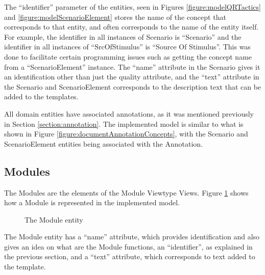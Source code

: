 The ``identifier'' parameter of the entities, seen in Figures \ref{figure:modelQRTactics} and \ref{figure:modelScenarioElement} stores the name of the concept that corresponds to that entity, and often corresponds to the name of the entity itself. For example, the identifier in all instances of Scenario is ``Scenario'' and the identifier in all instances of ``SrcOfStimulus'' is ``Source Of Stimulus''. This was done to facilitate certain programming issues such as getting the concept name from a ``ScenarioElement'' instance. The ``name'' attribute in the Scenario gives it an identification other than just the quality attribute, and the ``text'' attribute in the Scenario and ScenarioElement corresponds to the description text that can be added to the templates.

All domain entities have associated annotations, as it was mentioned previously in Section \ref{section:annotation}. The implemented model is similar to what is shown in Figure \ref{figure:documentAnnotationConcepts}, with the Scenario and ScenarioElement entities being associated with the Annotation.


\subsection{Modules}
\label{subsection:modules}

The Modules are the elements of the Module Viewtype Views. Figure \ref{figure:modelModule} shows how a Module is represented in the implemented model.

\begin{figure}[h]
\centering
\renewcommand {\umltextcolor}{black}
\renewcommand {\umlfillcolor}{none}
\renewcommand {\umldrawcolor}{black}

\caption{The Module entity}
\label{figure:modelModule}
\end{figure}

The Module entity has a ``name'' attribute, which provides identification and also gives an idea on what are the Module functions, an ``identifier'', as explained in the previous section, and a ``text'' attribute, which corresponds to text added to the template.

